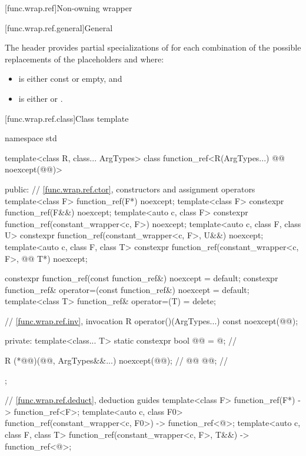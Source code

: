 [func.wrap.ref]{Non-owning wrapper}

[func.wrap.ref.general]{General}

\pnum
The header provides partial specializations of  for each combination of the possible replacements of the placeholders \cv{} and  where:
\begin{itemize}
\item \cv{} is either const or empty, and
\item {} is either  or .
\end{itemize}

[func.wrap.ref.class]{Class template }

\begin{codeblock}
namespace std {
  template<class R, class... ArgTypes>
  class function_ref<R(ArgTypes...) @\cv{}@ noexcept(@@)> {
  public:
    // \ref{func.wrap.ref.ctor}, constructors and assignment operators
    template<class F> function_ref(F*) noexcept;
    template<class F> constexpr function_ref(F&&) noexcept;
    template<auto c, class F> constexpr function_ref(constant_wrapper<c, F>) noexcept;
    template<auto c, class F, class U>
      constexpr function_ref(constant_wrapper<c, F>, U&&) noexcept;
    template<auto c, class F, class T>
      constexpr function_ref(constant_wrapper<c, F>, @\cv{}@ T*) noexcept;

    constexpr function_ref(const function_ref&) noexcept = default;
    constexpr function_ref& operator=(const function_ref&) noexcept = default;
    template<class T> function_ref& operator=(T) = delete;

    // \ref{func.wrap.ref.inv}, invocation
    R operator()(ArgTypes...) const noexcept(@@);

  private:
    template<class... T>
      static constexpr bool @@ = @\seebelownc@;             // \expos

    R (*@@)(@@, ArgTypes&&...) noexcept(@@);      // \expos
    @@ @@;                                       // \expos
  };

  // \ref{func.wrap.ref.deduct}, deduction guides
  template<class F>
    function_ref(F*) -> function_ref<F>;
  template<auto c, class F0>
    function_ref(constant_wrapper<c, F0>) -> function_ref<@\seebelow@>;
  template<auto c, class F, class T>
    function_ref(constant_wrapper<c, F>, T&&) -> function_ref<@\seebelow@>;
}
\end{codeblock}

